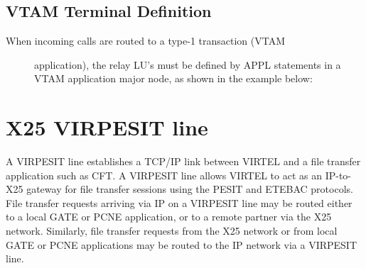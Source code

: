 \documentclass[letterpaper,10pt,english]{sphinxmanual}
\begin{document}
\ignorespaces 

\subsection{VTAM Terminal Definition}
\label{\detokenize{connectivity_guide:vtam-terminal-definition}}\label{\detokenize{connectivity_guide:index-54}}\begin{description}
\item[{When incoming calls are routed to a type-1 transaction (VTAM}] \leavevmode
application), the relay LU’s must be defined by APPL statements in a
VTAM application major node, as shown in the example below:

\end{description}

\begin{sphinxVerbatim}[commandchars=\\\{\}]
  
  
  
  
\end{sphinxVerbatim}

\newpage

\ignorespaces 

\section{X25 VIRPESIT line}
\label{\detokenize{connectivity_guide:x25-virpesit-line}}\label{\detokenize{connectivity_guide:index-55}}
A VIRPESIT line establishes a TCP/IP link between VIRTEL and a file transfer application such as CFT. A VIRPESIT line allows VIRTEL to act as an IP-to-X25 gateway for file transfer sessions using the PESIT and ETEBAC protocols. File transfer requests arriving via IP on a VIRPESIT line may be routed either to a local GATE or PCNE application, or to a remote partner via the X25 network. Similarly, file transfer requests from the X25 network or from local GATE or PCNE applications may be routed to the IP network via a VIRPESIT line.
\end{document}
